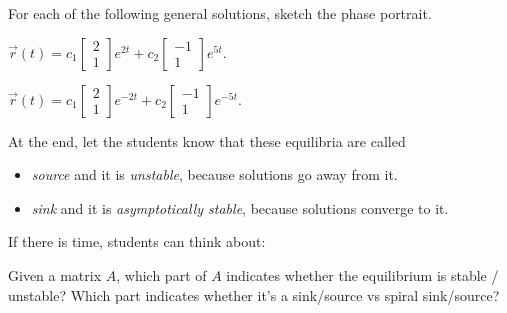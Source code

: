 \question
	For each of the following general solutions, sketch the phase portrait.
\begin{parts}
	\item $	\vec{r}(t) = c_1 \begin{bmatrix} 2 \\ 1 \end{bmatrix} e^{2t} + c_2 \begin{bmatrix} -1 \\ 1 \end{bmatrix} e^{5t}.$
	\item $	\vec{r}(t) = c_1 \begin{bmatrix} 2 \\ 1 \end{bmatrix} e^{-2t} + c_2 \begin{bmatrix} -1 \\ 1 \end{bmatrix} e^{-5t}.$	
\end{parts}
\begin{annotation}
	\begin{goals}
	At the end, let the students know that these equilibria are called 
	\begin{itemize}
		\item \emph{source} and it is \emph{unstable}, because solutions go away from it.
		\item \emph{sink} and it is \emph{asymptotically stable}, because solutions converge to it.
	\end{itemize}
	
	If there is time, students can think about:

	Given a matrix $A$, which part of $A$ indicates whether the equilibrium is stable / unstable? Which part indicates whether it's a sink/source vs spiral sink/source?
	\end{goals}
\end{annotation}




